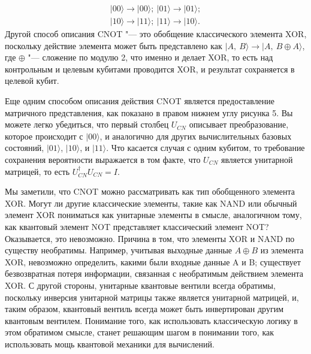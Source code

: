 \begin{multicols}{2}
{        \begin{equation}
            \begin{split}
                \vert00\rangle\rightarrow \vert00\rangle;~\vert01\rangle\rightarrow\vert01\rangle; \\
                \vert10\rangle\rightarrow\vert11\rangle;~\vert11\rangle\rightarrow\vert10\rangle.
            \end{split}
        \end{equation}
        Другой способ описания CNOT "--- это обобщение классического элемента XOR, поскольку
        действие элемента может быть представлено как $\vert A,~B\rangle\rightarrow\vert A,~B\oplus A\rangle$, где $\oplus$ "--- сложение по модулю 2, что именно и делает XOR, 
        то есть над контрольным и целевым кубитами проводится XOR, и результат сохраняется в целевой кубит.

        Еще одним способом описания действия CNOT является предоставление матричного представления, как показано в правом нижнем углу рисунка 5. Вы можете легко убедиться, что первый 
        столбец $U_{CN}$ описывает преобразование, которое происходит с $\vert00\rangle$, и аналогично для
        других вычислительных базовых состояний, $\vert01\rangle$, $\vert10\rangle$, и $\vert11\rangle$. 
        Что касается случая с одним кубитом, то требование сохранения вероятности выражается в том факте, что $U_{CN}$ является унитарной
        матрицей, то есть $U_{CN}^{\dagger}U_{CN}=I$.

        Мы заметили, что CNOT можно рассматривать как тип обобщенного элемента XOR. Могут
        ли другие классические элементы, такие как NAND или обычный элемент XOR пониматься как унитарные
        элементы в смысле, аналогичном тому, как квантовый элемент NOT представляет классический
        элемент NOT? Оказывается, это невозможно. Причина в том, что элементы XOR и NAND
        по существу необратимы. Например, учитывая выходные данные $A\oplus B$ из
        элемента XOR, невозможно определить, какими были входные данные A и B; существует
        безвозвратная потеря информации, связанная с необратимым действием элемента XOR.
        С другой стороны, унитарные квантовые вентили всегда обратимы, поскольку инверсия
        унитарной матрицы также является унитарной матрицей, и, таким образом, квантовый вентиль всегда может быть инвертирован
        другим квантовым вентилем. Понимание того, как использовать классическую логику в этом
        обратимом смысле, станет решающим шагом в понимании того, как использовать мощь квантовой механики для вычислений.

}
\end{multicols}
